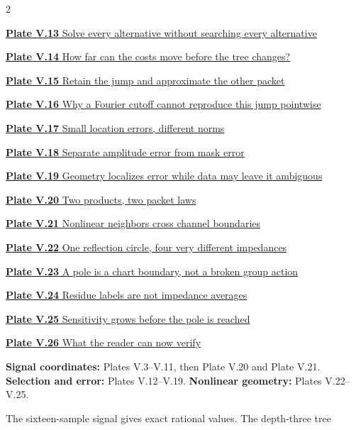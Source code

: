 \documentclass[11pt,letterpaper]{article}
\newcommand{\head}[1]{\par\vspace{2pt}{\sffamily\bfseries\normalsize #1}\par\vspace{1pt}}
\begin{document}
\begin{multicols}{2}
{\small\noindent\hyperlink{vpage13}{\textbf{Plate V.13} Solve every alternative without searching every alternative}\par\smallskip}
{\small\noindent\hyperlink{vpage14}{\textbf{Plate V.14} How far can the costs move before the tree changes?}\par\smallskip}
{\small\noindent\hyperlink{vpage15}{\textbf{Plate V.15} Retain the jump and approximate the other packet}\par\smallskip}
{\small\noindent\hyperlink{vpage16}{\textbf{Plate V.16} Why a Fourier cutoff cannot reproduce this jump pointwise}\par\smallskip}
{\small\noindent\hyperlink{vpage17}{\textbf{Plate V.17} Small location errors, different norms}\par\smallskip}
{\small\noindent\hyperlink{vpage18}{\textbf{Plate V.18} Separate amplitude error from mask error}\par\smallskip}
{\small\noindent\hyperlink{vpage19}{\textbf{Plate V.19} Geometry localizes error while data may leave it ambiguous}\par\smallskip}
{\small\noindent\hyperlink{vpage20}{\textbf{Plate V.20} Two products, two packet laws}\par\smallskip}
{\small\noindent\hyperlink{vpage21}{\textbf{Plate V.21} Nonlinear neighbors cross channel boundaries}\par\smallskip}
{\small\noindent\hyperlink{vpage22}{\textbf{Plate V.22} One reflection circle, four very different impedances}\par\smallskip}
{\small\noindent\hyperlink{vpage23}{\textbf{Plate V.23} A pole is a chart boundary, not a broken group action}\par\smallskip}
{\small\noindent\hyperlink{vpage24}{\textbf{Plate V.24} Residue labels are not impedance averages}\par\smallskip}
{\small\noindent\hyperlink{vpage25}{\textbf{Plate V.25} Sensitivity grows before the pole is reached}\par\smallskip}
{\small\noindent\hyperlink{vpage26}{\textbf{Plate V.26} What the reader can now verify}\par\smallskip}
\end{multicols}
\medskip
\head{Three reading routes}
\textbf{Signal coordinates:} Plates V.3--V.11, then Plate V.20 and Plate V.21.
\textbf{Selection and error:} Plates V.12--V.19.
\textbf{Nonlinear geometry:} Plates V.22--V.25.
\head{One model per question}
The sixteen-sample signal gives exact rational values. The depth-three tree
\end{document}
